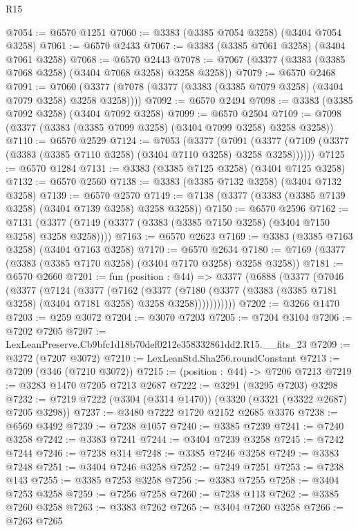 \begin{lexlean}{R15}
\begin{coremodule}
@7054 := @6570 @1251
@7060 := @3383 (@3385 @7054 @3258) (@3404 @7054 @3258)
@7061 := @6570 @2433
@7067 := @3383 (@3385 @7061 @3258) (@3404 @7061 @3258)
@7068 := @6570 @2443
@7078 := @7067 (@3377 (@3383 (@3385 @7068 @3258) (@3404 @7068 @3258) @3258 @3258))
@7079 := @6570 @2468
@7091 := @7060 (@3377 (@7078 (@3377 (@3383 (@3385 @7079 @3258) (@3404 @7079 @3258) @3258 @3258))))
@7092 := @6570 @2494
@7098 := @3383 (@3385 @7092 @3258) (@3404 @7092 @3258)
@7099 := @6570 @2504
@7109 := @7098 (@3377 (@3383 (@3385 @7099 @3258) (@3404 @7099 @3258) @3258 @3258))
@7110 := @6570 @2529
@7124 := @7053
    (@3377
      (@7091 (@3377 (@7109 (@3377 (@3383 (@3385 @7110 @3258) (@3404 @7110 @3258) @3258 @3258))))))
@7125 := @6570 @1284
@7131 := @3383 (@3385 @7125 @3258) (@3404 @7125 @3258)
@7132 := @6570 @2560
@7138 := @3383 (@3385 @7132 @3258) (@3404 @7132 @3258)
@7139 := @6570 @2570
@7149 := @7138 (@3377 (@3383 (@3385 @7139 @3258) (@3404 @7139 @3258) @3258 @3258))
@7150 := @6570 @2596
@7162 := @7131 (@3377 (@7149 (@3377 (@3383 (@3385 @7150 @3258) (@3404 @7150 @3258) @3258 @3258))))
@7163 := @6570 @2623
@7169 := @3383 (@3385 @7163 @3258) (@3404 @7163 @3258)
@7170 := @6570 @2634
@7180 := @7169 (@3377 (@3383 (@3385 @7170 @3258) (@3404 @7170 @3258) @3258 @3258))
@7181 := @6570 @2660
@7201 := fun (position : @44) =>
  @3377
    (@6888
      (@3377
        (@7046
          (@3377
            (@7124
              (@3377
                (@7162
                  (@3377
                    (@7180
                      (@3377 (@3383 (@3385 @7181 @3258) (@3404 @7181 @3258) @3258 @3258)))))))))))
@7202 := @3266 @1470
@7203 := @259 @3072
@7204 := @3070 @7203
@7205 := @7204 @3104
@7206 := @7202 @7205
@7207 := LexLeanPreserve.Cb9bfc1d18b70def0212e358332861dd2.R15.__fits_23
@7209 := @3272 (@7207 @3072)
@7210 := LexLeanStd.Sha256.roundConstant
@7213 := @7209 (@346 (@7210 @3072))
@7215 := (position : @44) -> @7206 @7213
@7219 := @3283 @1470 @7205 @7213 @2687
@7222 := @3291 (@3295 @7203) @3298
@7232 := @7219 @7222 (@3304 (@3314 @1470)) (@3320 (@3321 (@3322 @2687) @7205 @3298))
@7237 := @3480 @7222 @1720 @2152 @2685 @3376
@7238 := @6569 @3492
@7239 := @7238 @1057
@7240 := @3385 @7239
@7241 := @7240 @3258
@7242 := @3383 @7241
@7244 := @3404 @7239 @3258
@7245 := @7242 @7244
@7246 := @7238 @314
@7248 := @3385 @7246 @3258
@7249 := @3383 @7248
@7251 := @3404 @7246 @3258
@7252 := @7249 @7251
@7253 := @7238 @143
@7255 := @3385 @7253 @3258
@7256 := @3383 @7255
@7258 := @3404 @7253 @3258
@7259 := @7256 @7258
@7260 := @7238 @113
@7262 := @3385 @7260 @3258
@7263 := @3383 @7262
@7265 := @3404 @7260 @3258
@7266 := @7263 @7265

\end{coremodule}
\end{lexlean}
